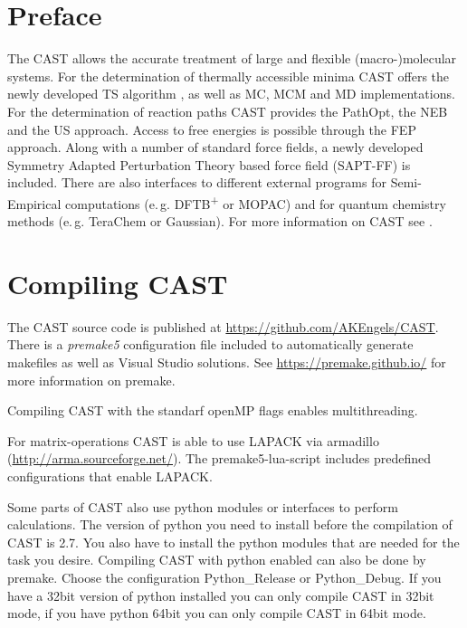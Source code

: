 \documentclass[10pt,a4paper]{article} %
\begin{document}
	\section{Preface}
	The \ac{CAST} allows the accurate treatment of large and flexible (macro-)molecular systems. For the determination of thermally accessible minima \ac{CAST} offers the newly developed \ac{TS} algorithm \supercite{tabusearch}, as well as \ac{MC}\supercite{mc_original}, \ac{MCM}\supercite{MCM_original} and \acf{MD}\supercite{computer_simulation_of_MD} implementations. For the determination of reaction paths \ac{CAST} provides the PathOpt\supercite{pathopt}, the \ac{NEB}\supercite{neb_original} and the \ac{US}\supercite{umbrella_sampling} approach. Access to free energies is possible through the \ac{FEP} approach. Along with a number of standard force fields, a newly developed Symmetry Adapted Perturbation Theory based force field (\acs{SAPT-FF}) is included. There are also interfaces to different external programs for Semi-Empirical computations (e.\,g. DFTB\textsuperscript{+}\supercite{dftb} or MOPAC\supercite{mopac, mopac_parallel}) and for quantum chemistry methods (e.\,g. TeraChem\supercite{terachem} or Gaussian). For more information on \ac{CAST} see \cite{cast}.
	\newpage
	
	
	\section{Compiling CAST} \label{sec:compile}
	The \ac{CAST} source code is published at \url{https://github.com/AKEngels/CAST}. There is a \textit{premake5} configuration file included to automatically generate makefiles as well as Visual Studio solutions. See \url{https://premake.github.io/} for more information on premake.
	
	Compiling \ac{CAST} with the standarf openMP flags enables multithreading.
	
	For matrix-operations \ac{CAST} is able to use \ac{LAPACK} via armadillo (\url{http://arma.sourceforge.net/}). The premake5-lua-script includes predefined configurations that enable LAPACK. 
	
	Some parts of \ac{CAST} also use python modules or interfaces to perform calculations. The version of python you need to install before the compilation of CAST is 2.7. You also have to install the python modules that are needed for the task you desire. Compiling CAST with python enabled can also be done by premake. Choose the configuration Python\_Release or Python\_Debug. If you have a 32bit version of python installed you can only compile \ac{CAST} in 32bit mode, if you have python 64bit you can only compile \ac{CAST} in 64bit mode. 
	
\end{document}
